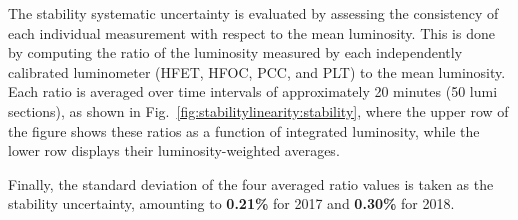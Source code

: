 The stability systematic uncertainty is evaluated by assessing the consistency of each individual measurement with respect to the mean luminosity. This is done by computing the ratio of the luminosity measured by each independently calibrated luminometer (HFET, HFOC, PCC, and PLT) to the mean luminosity. Each ratio is averaged over time intervals of approximately 20 minutes (50 lumi sections), as shown in Fig.~\ref{fig:stabilitylinearity:stability}, where the upper row of the figure shows these ratios as a function of integrated luminosity, while the lower row displays their luminosity-weighted averages.

Finally, the standard deviation of the four averaged ratio values is taken as the stability uncertainty, amounting to \textbf{0.21\%} for 2017 and \textbf{0.30\%} for 2018.


